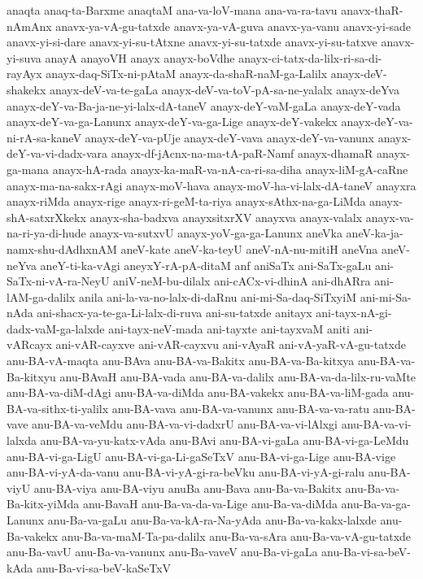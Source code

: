 {anaqta
anaq-ta-Barxme
anaqtaM
ana-va-loV-mana
ana-va-ra-tavu
anavx-thaR-nAmAnx
anavx-ya-vA-gu-tatxde
anavx-ya-vA-guva
anavx-ya-vanu
anavx-yi-sade
anavx-yi-si-dare
anavx-yi-su-tAtxne
anavx-yi-su-tatxde
anavx-yi-su-tatxve
anavx-yi-suva
anayA
anayoVH
anayx
anayx-boVdhe
anayx-ci-tatx-da-lilx-ri-sa-di-rayAyx
anayx-daq-SiTx-ni-pAtaM
anayx-da-shaR-naM-ga-Lalilx
anayx-deV-shakekx
anayx-deV-va-te-gaLa
anayx-deV-va-toV-pA-sa-ne-yalalx
anayx-deYva
anayx-deY-va-Ba-ja-ne-yi-lalx-dA-taneV
anayx-deY-vaM-gaLa
anayx-deY-vada
anayx-deY-va-ga-Lanunx
anayx-deY-va-ga-Lige
anayx-deY-vakekx
anayx-deY-va-ni-rA-sa-kaneV
anayx-deY-va-pUje
anayx-deY-vava
anayx-deY-va-vanunx
anayx-deY-va-vi-dadx-vara
anayx-df-jAcnx-na-ma-tA-paR-Namf
anayx-dhamaR
anayx-ga-mana
anayx-hA-rada
anayx-ka-maR-va-nA-ca-ri-sa-diha
anayx-liM-gA-caRne
anayx-ma-na-sakx-rAgi
anayx-moV-hava
anayx-moV-ha-vi-lalx-dA-taneV
anayxra
anayx-riMda
anayx-rige
anayx-ri-geM-ta-riya
anayx-sAthx-na-ga-LiMda
anayx-shA-satxrXkekx
anayx-sha-badxva
anayxsitxrXV
anayxva
anayx-valalx
anayx-va-na-ri-ya-di-hude
anayx-va-sutxvU
anayx-yoV-ga-ga-Lanunx
aneVka
aneV-ka-ja-namx-shu-dAdhxnAM
aneV-kate
aneV-ka-teyU
aneV-nA-nu-mitiH
aneVna
aneV-neYva
aneY-ti-ka-vAgi
aneyxY-rA-pA-ditaM
anf
aniSaTx
ani-SaTx-gaLu
ani-SaTx-ni-vA-ra-NeyU
aniV-neM-bu-dilalx
ani-cACx-vi-dhinA
ani-dhARra
ani-lAM-ga-dalilx
anila
ani-la-va-no-lalx-di-daRnu
ani-mi-Sa-daq-SiTxyiM
ani-mi-Sa-nAda
ani-shacx-ya-te-ga-Li-lalx-di-ruva
ani-su-tatxde
anitayx
ani-tayx-nA-gi-dadx-vaM-ga-lalxde
ani-tayx-neV-mada
ani-tayxte
ani-tayxvaM
aniti
ani-vARcayx
ani-vAR-cayxve
ani-vAR-cayxvu
ani-vAyaR
ani-vA-yaR-vA-gu-tatxde
anu-BA-vA-maqta
anu-BAva
anu-BA-va-Bakitx
anu-BA-va-Ba-kitxya
anu-BA-va-Ba-kitxyu
anu-BAvaH
anu-BA-vada
anu-BA-va-dalilx
anu-BA-va-da-lilx-ru-vaMte
anu-BA-va-diM-dAgi
anu-BA-va-diMda
anu-BA-vakekx
anu-BA-va-liM-gada
anu-BA-va-sithx-ti-yalilx
anu-BA-vava
anu-BA-va-vanunx
anu-BA-va-va-ratu
anu-BA-vave
anu-BA-va-veMdu
anu-BA-va-vi-dadxrU
anu-BA-va-vi-lAlxgi
anu-BA-va-vi-lalxda
anu-BA-va-yu-katx-vAda
anu-BAvi
anu-BA-vi-gaLa
anu-BA-vi-ga-LeMdu
anu-BA-vi-ga-LigU
anu-BA-vi-ga-Li-gaSeTxV
anu-BA-vi-ga-Lige
anu-BA-vige
anu-BA-vi-yA-da-vanu
anu-BA-vi-yA-gi-ra-beVku
anu-BA-vi-yA-gi-ralu
anu-BA-viyU
anu-BA-viya
anu-BA-viyu
anuBa
anu-Bava
anu-Ba-va-Bakitx
anu-Ba-va-Ba-kitx-yiMda
anu-BavaH
anu-Ba-va-da-va-Lige
anu-Ba-va-diMda
anu-Ba-va-ga-Lanunx
anu-Ba-va-gaLu
anu-Ba-va-kA-ra-Na-yAda
anu-Ba-va-kakx-lalxde
anu-Ba-vakekx
anu-Ba-va-maM-Ta-pa-dalilx
anu-Ba-va-sAra
anu-Ba-va-vA-gu-tatxde
anu-Ba-vavU
anu-Ba-va-vanunx
anu-Ba-vaveV
anu-Ba-vi-gaLa
anu-Ba-vi-sa-beV-kAda
anu-Ba-vi-sa-beV-kaSeTxV
}
